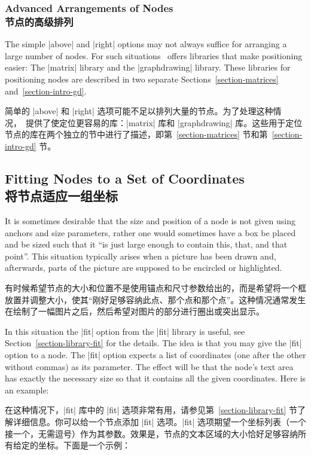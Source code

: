\subsubsection{Advanced Arrangements of Nodes\\节点的高级排列}

The simple |above| and |right| options may not always suffice for arranging a
large number of nodes. For such situations \tikzname\ offers libraries that
make positioning easier: The |matrix| library and the |graphdrawing| library.
These libraries for positioning nodes are described in two separate
Sections~\ref{section-matrices} and~\ref{section-intro-gd}.

简单的 |above| 和 |right| 选项可能不足以排列大量的节点。为了处理这种情况，\tikzname\ 提供了使定位更容易的库：|matrix| 库和 |graphdrawing| 库。这些用于定位节点的库在两个独立的节中进行了描述，即第~\ref{section-matrices} 节和第~\ref{section-intro-gd} 节。

\subsection{Fitting Nodes to a Set of Coordinates\\将节点适应一组坐标}
\label{section-nodes-fitting}

It is sometimes desirable that the size and position of a node is not given
using anchors and size parameters, rather one would sometimes have a box be
placed and be sized such that it ``is just large enough to contain this, that,
and that point''. This situation typically arises when a picture has been drawn
and, afterwards, parts of the picture are supposed to be encircled or
highlighted.

有时候希望节点的大小和位置不是使用锚点和尺寸参数给出的，而是希望将一个框放置并调整大小，使其“刚好足够容纳此点、那个点和那个点”。这种情况通常发生在绘制了一幅图片之后，然后希望对图片的部分进行圈出或突出显示。

In this situation the |fit| option from the |fit| library is useful, see
Section~\ref{section-library-fit} for the details. The idea is that you may
give the |fit| option to a node. The |fit| option expects a list of coordinates
(one after the other without commas) as its parameter. The effect will be that
the node's text area has exactly the necessary size so that it contains all the
given coordinates. Here is an example:

在这种情况下，|fit| 库中的 |fit| 选项非常有用，请参见第~\ref{section-library-fit} 节了解详细信息。你可以给一个节点添加 |fit| 选项。|fit| 选项期望一个坐标列表（一个接一个，无需逗号）作为其参数。效果是，节点的文本区域的大小恰好足够容纳所有给定的坐标。下面是一个示例：

